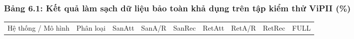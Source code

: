 \documentclass[
  11pt,
  a4paper,
]{article}
\newcounter{none} %
\begin{document}
\subsubsection{Bảng 6.1: Kết quả làm sạch dữ liệu bảo toàn khả dụng trên tập kiểm thử ViPII
(\%)}\label{bux1ea3ng-6.1-kux1ebft-quux1ea3-luxe0m-sux1ea1ch-dux1eef-liux1ec7u-bux1ea3o-touxe0n-khux1ea3-dux1ee5ng-truxean-tux1eadp-kiux1ec3m-thux1eed-vipii}

{\def\LTcaptype{none} %
\begin{longtable}[]{@{}
  >{\raggedright\arraybackslash}p{}
  >{\raggedright\arraybackslash}p{}
  >{\raggedleft\arraybackslash}p{}
  >{\raggedleft\arraybackslash}p{}
  >{\raggedleft\arraybackslash}p{}
  >{\raggedleft\arraybackslash}p{}
  >{\raggedleft\arraybackslash}p{}
  >{\raggedleft\arraybackslash}p{}
  >{\raggedleft\arraybackslash}p{}@{}}
\toprule\noalign{}
\begin{minipage}[b]{\linewidth}\raggedright
Hệ thống / Mô hình
\end{minipage} & \begin{minipage}[b]{\linewidth}\raggedright
Phân loại
\end{minipage} & \begin{minipage}[b]{\linewidth}\raggedleft
SanAtt
\end{minipage} & \begin{minipage}[b]{\linewidth}\raggedleft
SanA/R
\end{minipage} & \begin{minipage}[b]{\linewidth}\raggedleft
SanRec
\end{minipage} & \begin{minipage}[b]{\linewidth}\raggedleft
RetAtt
\end{minipage} & \begin{minipage}[b]{\linewidth}\raggedleft
RetA/R
\end{minipage} & \begin{minipage}[b]{\linewidth}\raggedleft
RetRec
\end{minipage} & \begin{minipage}[b]{\linewidth}\raggedleft
FULL
\end{minipage} \\

\end{longtable}}
\end{document}
